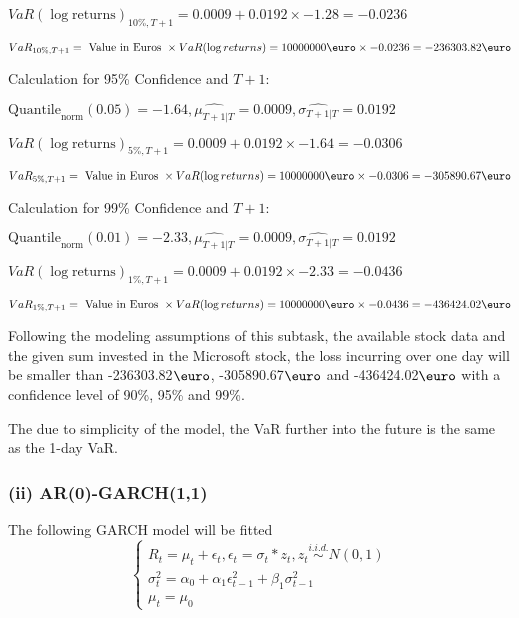 \indent\indent $VaR(\log \text{returns})_{10\%, T + 1} = 0.0009 + 0.0192\times-1.28 = -0.0236$

\indent\indent $VaR_{10\%, T + 1} = \text{ Value in Euros } \times VaR(\log returns) = 10 000 000 \text{\euro} \times-0.0236 = -236303.82 \text{\euro}$\newline




Calculation for 95\% Confidence and $T+1$:

\indent\indent $\text{Quantile}_\text{norm}(0.05) = -1.64,\hat{\mu_{T+1|T}} = 0.0009, \hat{\sigma_{T+1|T}} = 0.0192$

\indent\indent $VaR(\log \text{returns})_{5\%, T + 1} = 0.0009 + 0.0192\times-1.64 = -0.0306$

\indent\indent $VaR_{5\%, T + 1} = \text{ Value in Euros } \times VaR(\log returns) = 10 000 000 \text{\euro} \times-0.0306 = -305890.67 \text{\euro}$\newline




Calculation for 99\% Confidence and $T+1$:

\indent\indent $\text{Quantile}_\text{norm}(0.01) = -2.33,\hat{\mu_{T+1|T}} = 0.0009, \hat{\sigma_{T+1|T}} = 0.0192$

\indent\indent $VaR(\log \text{returns})_{1\%, T + 1} = 0.0009 + 0.0192\times-2.33 = -0.0436$

\indent\indent $VaR_{1\%, T + 1} = \text{ Value in Euros } \times VaR(\log returns) = 10 000 000 \text{\euro} \times-0.0436 = -436424.02 \text{\euro}$\newline


Following the modeling assumptions of this subtask, the available stock data and the given sum invested in the Microsoft stock, the loss incurring over one day will be smaller than -236303.82$\text{\euro}$, -305890.67$\text{\euro}$  and -436424.02$\text{\euro}$  with a confidence level of 90\%, 95\%  and 99\%.

The due to simplicity of the model, the VaR further into the future is the same as the 1-day VaR.


\subsubsection{(ii) AR(0)-GARCH(1,1)}
 The following GARCH model will be fitted 
$$\begin{cases} R_t = \mu_t + \epsilon_t, \epsilon_t = \sigma_t  * z_t, z_t \overset{i.i.d.}{\sim} N(0,1) \\ \sigma^2_t = \alpha_0 + \alpha_1 \epsilon^2_{t-1} + \beta_1 \sigma^2_{t-1} \\ \mu_t = \mu_0 \end{cases}$$


